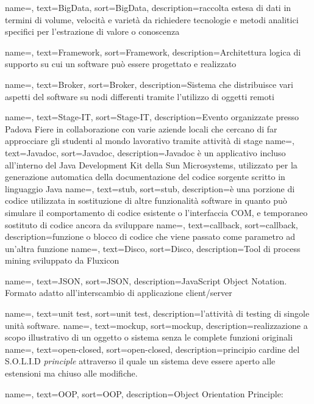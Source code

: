{
    name=,
    text=BigData,
    sort=BigData,
    description={raccolta estesa di dati in termini di volume, velocità e varietà da richiedere tecnologie e metodi analitici specifici per l'estrazione di valore o conoscenza}
}

{
    name=,
    text=Framework,
    sort=Framework,
    description={Architettura logica di supporto su cui un software può essere progettato e realizzato}
}

{
    name=,
    text=Broker,
    sort=Broker,
    description={Sistema che distribuisce vari aspetti del software su nodi differenti tramite l'utilizzo di oggetti remoti}
}

{
    name=,
    text=Stage-IT,
    sort=Stage-IT,
    description={Evento organizzate presso Padova Fiere in collaborazione con varie aziende locali che cercano di far approcciare gli studenti al mondo lavorativo tramite attività di stage}
}
{
    name=,
    text=Javadoc,
    sort=Javadoc,
    description={Javadoc è un applicativo incluso all'interno del Java Development Kit della Sun Microsystems, utilizzato per la generazione automatica della documentazione del codice sorgente scritto in linguaggio Java}
}
{
    name=,
    text=stub,
    sort=stub,
    description={è una porzione di codice utilizzata in sostituzione di altre funzionalità software in quanto può simulare il comportamento di codice esistente o l'interfaccia COM, e temporaneo sostituto di codice ancora da sviluppare}
}
{
    name=,
    text=callback,
    sort=callback,
    description={funzione o blocco di codice che viene passato come parametro ad un'altra funzione}
}
{
    name=,
    text=Disco,
    sort=Disco,
    description={Tool di process mining sviluppato da Fluxicon}
}

{
    name=,
    text=JSON,
    sort=JSON,
    description={JavaScript Object Notation. Formato adatto all'interscambio di applicazione client/server}
}

{
    name=,
    text=unit test,
    sort=unit test,
    description={l'attività di testing di singole unità software.}
}
{
    name=,
    text=mockup,
    sort=mockup,
    description={realizzazione a scopo illustrativo di un oggetto o sistema senza le complete funzioni originali}
}
{
    name=,
    text=open-closed,
    sort=open-closed,
    description={principio cardine del S.O.L.I.D \textit{principle} attraverso il quale un sistema deve essere aperto alle estensioni ma chiuso alle modifiche.}
}

{
    name=,
    text=OOP,
    sort=OOP,
    description={Object Orientation Principle: }
}